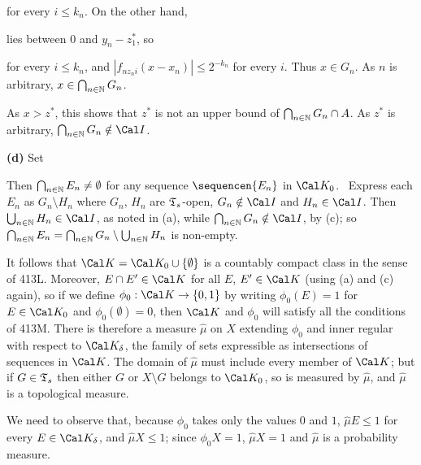 {\noindent for every $i\le k_n$.   On the other hand,


\noindent lies between $0$ and $y_n-z_1^*$, so


\noindent for every $i\le k_n$, and $|f_{nz_ni}(x-x_n)|\le 2^{-k_n}$ for
every $i$.   Thus $x\in G_n$.   As $n$ is arbitrary,
$x\in\bigcap_{n\in\Bbb N}G_n$.

As $x>z^*$, this shows that $z^*$ is not an upper bound of
$\bigcap_{n\in\Bbb N}G_n\cap A$.   As $z^*$ is arbitrary,
$\bigcap_{n\in\Bbb N}G_n\notin\Cal I$.\ \Qed

\medskip

{\bf (d)} Set


\noindent Then $\bigcap_{n\in\Bbb N}E_n\ne\emptyset$ for any sequence
$\sequencen{E_n}$ in $\Cal K_0$.   \Prf\ Express each $E_n$ as
$G_n\setminus H_n$ where $G_n$, $H_n$ are $\frak T_s$-open,
$G_n\notin\Cal I$ and $H_n\in\Cal I$.   Then
$\bigcup_{n\in\Bbb N}H_n\in\Cal I$,
as noted in (a), while $\bigcap_{n\in\Bbb N}G_n\notin\Cal I$, by (c);  so
$\bigcap_{n\in\Bbb N}E_n
=\bigcap_{n\in\Bbb N}G_n\setminus\bigcup_{n\in\Bbb N}H_n$ is
non-empty.\ \Qed

It follows that $\Cal K=\Cal K_0\cup\{\emptyset\}$ is a countably
compact class in the sense of 413L.   Moreover, $E\cap E'\in\Cal K$ for
all $E$, $E'\in\Cal K$ (using (a) and (c) again), so if we define
$\phi_0:\Cal K\to\{0,1\}$ by
writing $\phi_0(E)=1$ for $E\in\Cal K_0$ and $\phi_0(\emptyset)=0$, then
$\Cal K$ and $\phi_0$ will satisfy all the conditions of 413M.   There
is therefore a measure $\hat\mu$ on $X$ extending $\phi_0$ and inner
regular with respect to $\Cal K_{\delta}$, the family of sets
expressible as intersections of sequences in $\Cal K$.   The domain of
$\hat\mu$ must include every member of $\Cal K$;  but if $G\in\frak T_s$
then either $G$ or $X\setminus G$ belongs to $\Cal K_0$, so is
measured by $\hat\mu$, and $\hat\mu$ is a topological measure.

We need to observe that, because $\phi_0$ takes only the values $0$ and
$1$, $\hat\mu E\le 1$ for every $E\in\Cal K_{\delta}$, and $\hat\mu X\le
1$;  since $\phi_0X=1$, $\hat\mu X=1$ and $\hat\mu$ is a probability
measure.

\medskip

}
